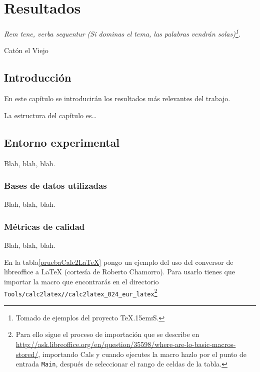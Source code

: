 \documentclass[spanish,openright]{book}
\def\texis{\TeX \raise.15em\hbox{\textsc{i}}S}
\newenvironment{FraseCelebre}{\begin{list}{}{\setlength{\leftmargin}{0.5\textwidth}\setlength{\parsep}{0cm}\addtolength{\topsep}{0.5cm}}
}
{\unskip \end{list}}
\newenvironment{Frase}{\item \begin{flushright}\small\em}{\end{flushright}}
\newenvironment{Fuente}{\item \begin{flushright}\small}{\end{flushright}}
\begin{document}
\chapter{Resultados}
\label{cha:resultados}


\begin{FraseCelebre}
\begin{Frase}
Rem tene, verba sequentur (Si dominas el tema, las palabras vendrán
solas)\footnote{Tomado de ejemplos del proyecto \texis{}.}.
\end{Frase}
\begin{Fuente}
Catón el Viejo
\end{Fuente}
\end{FraseCelebre}

\section{Introducción}
\label{sec:introduccion-resultados}

En este capítulo se introducirán los resultados más relevantes del
trabajo.

La estructura del capítulo es\ldots


\section{Entorno experimental}
\label{sec:entorno-experimental}

Blah, blah, blah.


\subsection{Bases de datos utilizadas}
\label{sec:bases-de-datos-1}

Blah, blah, blah.


\subsection{Métricas de calidad}
\label{sec:metricas-de-calidad}

Blah, blah, blah.

En la tabla\ref{pruebaCalc2LaTeX} pongo un ejemplo del uso del conversor
de libreoffice a \LaTeX{} (cortesía de Roberto Chamorro). Para usarlo
tienes que importar la macro que encontrarás en el directorio
\texttt{Tools/calc2latex//calc2latex\_024\_eur\_latex}\footnote{Para
ello sigue el proceso de importación que se describe en
\url{http://ask.libreoffice.org/en/question/35598/where-are-lo-basic-macros-stored/},
importando Cals
y cuando ejecutes la macro hazlo por el punto de entrada
\texttt{Main}, después de seleccionar el rango de celdas de la tabla.}
\end{document}
